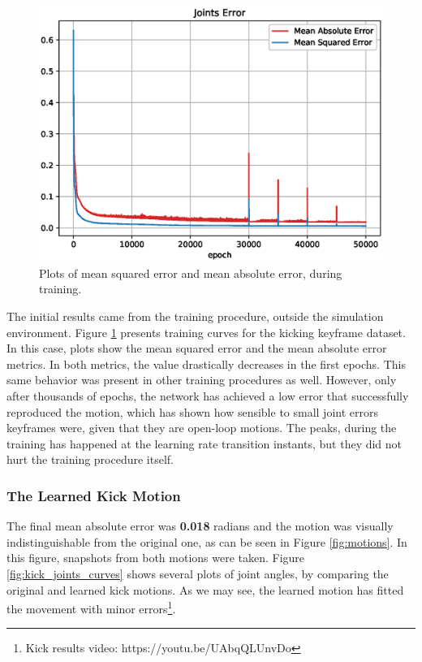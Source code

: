 \begin{figure}[H]
	\centering
	\includegraphics[width=1\textwidth]{Cap6/errors}
	\caption{Plots of mean squared error and mean absolute error, during training.}
	\label{fig:errors}
\end{figure}

The initial results came from the training procedure, outside the simulation environment. Figure \ref{fig:errors} presents training curves for the kicking keyframe dataset. In this case, plots show the mean squared error and the mean absolute error metrics. In both metrics, the value drastically decreases in the first epochs. This same behavior was present in other training procedures as well. However, only after thousands of epochs, the network has achieved a low error that successfully reproduced the motion, which has shown how sensible to small joint errors keyframes were, given that they are open-loop motions. The peaks, during the training has happened at the learning rate transition instants, but they did not hurt the training procedure itself.

\subsubsection{The Learned Kick Motion}

The final mean absolute error was \textbf{0.018} radians and the motion was visually indistinguishable from the original one, as can be seen in Figure \ref{fig:motions}. In this figure, snapshots from both motions were taken. Figure \ref{fig:kick_joints_curves} shows several plots of joint angles, by comparing the original and learned kick motions. As we may see, the learned motion has fitted the movement with minor errors\footnote{\label{footnote_walk} Kick results video: https://youtu.be/UAbqQLUnvDo}.

